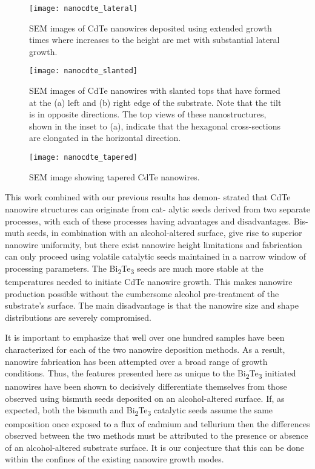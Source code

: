 \begin{figure}
    \centering
    \texttt{[image: nanocdte\_lateral]}
    \caption{\label{fig:nanocdte_lateral}SEM images of CdTe nanowires deposited using extended 
        growth times where increases to the height are met with substantial lateral growth.}
\end{figure}
\begin{figure}
    \centering
    \texttt{[image: nanocdte\_slanted]}
    \caption{\label{fig:nanocdte_slanted}SEM images of CdTe nanowires with slanted tops that have formed at the (a) left and (b) right edge of the substrate. Note that the
        tilt is in opposite directions. The top views of these nanostructures, shown in the inset to (a), indicate that the hexagonal cross-sections are
        elongated in the horizontal direction.}
\end{figure}
\begin{figure}
    \centering
    \texttt{[image: nanocdte\_tapered]}
    \caption{\label{fig:nanocdte_tapered}SEM image showing tapered CdTe nanowires.}
\end{figure}
This work combined with our previous results has demon-
strated that CdTe nanowire structures can originate from cat-
alytic seeds derived from two separate processes, with each
of these processes having advantages and disadvantages. Bis-
muth seeds, in combination with an alcohol-altered surface,
give rise to superior nanowire uniformity, but there exist
nanowire height limitations and fabrication can only proceed
using volatile catalytic seeds maintained in a narrow window
of processing parameters. The Bi\textsubscript{2}Te\textsubscript{3} seeds are much more stable at the temperatures needed to initiate CdTe nanowire growth. This makes nanowire production possible without the
cumbersome alcohol pre-treatment of the substrate's surface.
The main disadvantage is that the nanowire size and shape distributions are severely compromised.

It is important to emphasize that well over one hundred
samples have been characterized for each of the two nanowire
deposition methods. As a result, nanowire fabrication has
been attempted over a broad range of growth conditions.
Thus, the features presented here as unique to the Bi\textsubscript{2}Te\textsubscript{3}
initiated nanowires have been shown to decisively differentiate
themselves from those observed using bismuth seeds deposited
on an alcohol-altered surface. If, as expected, both the bismuth
and Bi\textsubscript{2}Te\textsubscript{3} catalytic seeds assume the same composition once
exposed to a flux of cadmium and tellurium then the differences
observed between the two methods must be attributed to the
presence or absence of an alcohol-altered substrate surface. It
is our conjecture that this can be done within the confines of
the existing nanowire growth modes.

